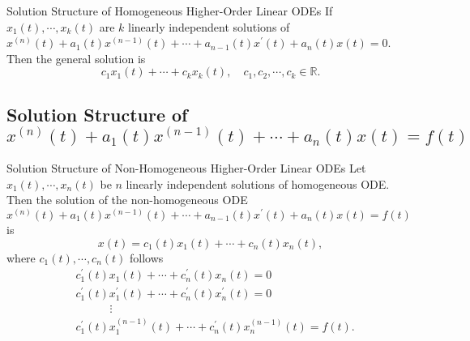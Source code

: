 \begin{proposition}{Solution Structure of Homogeneous Higher-Order Linear ODEs}{}
  If $x_1(t), \cdots, x_k(t)$ are $k$ linearly independent solutions of
  $x^{(n)}(t) + a_1(t)x^{(n-1)}(t) + \cdots + a_{n-1}(t)x^{\prime}(t) + a_n(t)x(t) = 0$.
  Then the general solution is
  \begin{equation}
    c_1x_1(t) + \cdots + c_kx_k(t), \quad c_1,c_2,\cdots,c_k \in \mathbb{R}.
  \end{equation}
\end{proposition}

\subsection{Solution Structure of $x^{(n)}(t) + a_1(t)x^{(n-1)}(t) + \cdots + a_n(t)x(t) = f(t)$}

\begin{proposition}{Solution Structure of Non-Homogeneous Higher-Order Linear ODEs}{}
  Let $x_1(t), \cdots, x_n(t)$ be $n$ linearly independent solutions of homogeneous ODE.
  Then the solution of the non-homogeneous ODE
  $x^{(n)}(t) + a_1(t)x^{(n-1)}(t) + \cdots + a_{n-1}(t)x^{\prime}(t) + a_n(t)x(t) = f(t)$
  is
  \begin{equation}
    x(t) = c_1(t)x_1(t) + \cdots + c_n(t)x_n(t),
  \end{equation}
  where $c_1(t),\cdots,c_n(t)$ follows
  \begin{align}
    & c^{\prime}_1(t)x_1(t) + \cdots + c_n^{\prime}(t)x_n(t) = 0\\
    & c^{\prime}_1(t)x_1^{\prime}(t) + \cdots + c_n^{\prime}(t)x_n^{\prime}(t) = 0\\
    & \quad \quad \quad \vdots\\
    & c^{\prime}_1(t)x_1^{(n-1)}(t) + \cdots +  c_n^{\prime}(t)x_n^{(n-1)}(t) = f(t).
  \end{align}
\end{proposition}

